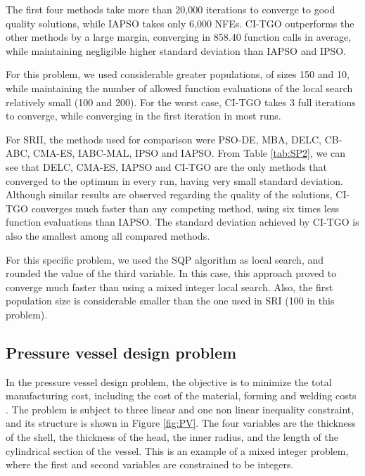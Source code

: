 

The first four methods take more than 20,000 iterations to converge to good quality solutions, while IAPSO takes only 6,000 NFEs. CI-TGO outperforms the other methods by a large margin, converging in 858.40 function calls in average, while maintaining negligible higher standard deviation than IAPSO and IPSO.

For this problem, we used considerable greater populations, of sizes 150 and 10, while maintaining the number of allowed function evaluations of the local search relatively small (100 and 200). For the worst case, CI-TGO takes 3 full iterations to converge, while converging in the first iteration in most runs.

For SRII, the methods used for comparison were PSO-DE, MBA, DELC, CB-ABC, CMA-ES, IABC-MAL, IPSO and IAPSO. From Table \ref{tab:SP2}, we can see that DELC, CMA-ES, IAPSO and CI-TGO are the only methods that converged to the optimum in every run, having very small standard deviation. Although similar results are observed regarding the quality of the solutions, CI-TGO converges much faster than any competing method, using six times less function evaluations than IAPSO. The standard deviation achieved by CI-TGO is also the smallest among all compared methods.



For this specific problem, we used the SQP algorithm as local search, and rounded the value of the third variable. In this case, this approach proved to converge much faster than using a mixed integer local search. Also, the first population size is considerable smaller than the one used in SRI (100 in this problem).



\subsection{Pressure vessel design problem}

In the pressure vessel design problem, the objective is to minimize the total manufacturing cost, including the cost of the material, forming and welding costs \citep{PV}. The problem is subject to three linear and one non linear inequality constraint, and its structure is shown in Figure \ref{fig:PV}. The four variables are the thickness of the shell, the thickness of the head, the inner radius, and the length of the cylindrical section of the vessel. This is an example of a mixed integer problem, where the first and second variables are constrained to be integers.


